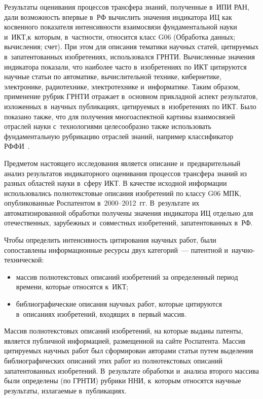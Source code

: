\begin{multicols}{2}
  Результаты оценивания процессов трансфера знаний, полученные в~ИПИ РАН, 
дали возмож\-ность впервые в~РФ вычислить значения индикатора ИЦ как 
косвенного показателя интенсив\-ности взаимосвязи фундаментальной науки 
и~ИКТ,\linebreak \mbox{к~которым}, в~частности, 
относится класс G06 (Обработка данных; вычисления; счет). При этом для 
описания тематики научных статей, цитируемых в~запатентованных 
изобретениях, использовался ГРНТИ. Вычисленные значения индикатора показали, что наиболее 
часто в~изобретениях по ИКТ цитируются научные статьи по автоматике, 
вычислительной технике, кибернетике, электронике, радиотехнике, 
электротехнике и~информатике. Таким образом, применение рубрик ГРНТИ 
отражает в~основном прикладной аспект результатов, изложенных в~научных 
пуб\-ли\-ка\-ци\-ях, цитируемых в~изобретениях по ИКТ. Было показано также, что для 
получения многоаспектной картины взаимосвязей отраслей науки с~технологиями 
целесообразно также использовать фундаментальную рубрикацию отраслей 
знаний, например классификатор РФФИ~\cite{19-min}.
  
  Предметом настоящего исследования является описание и~предварительный 
анализ результатов индикаторного оценивания процессов трансфера знаний из 
разных областей науки в~сферу ИКТ. В качестве исходной информации 
использовались полнотекстовые описания изобретений по классу G06 МПК, 
опуб\-ли\-ко\-ван\-ные Роспатентом в~2000--2012~гг. В~результате их 
автоматизированной обработки получены значения индикатора ИЦ отдельно для 
отечественных, зарубежных и~совместных изо\-бре\-тений, запатентованных в~РФ.



  
  Чтобы определить интенсивность цитирования научных работ, были 
сопоставлены информационные ресурсы двух категорий~--- патентной  
и~на\-уч\-но-тех\-ни\-че\-ской:
  \begin{itemize}
\item массив полнотекстовых описаний изобретений за определенный 
период времени, которые относятся к~ИКТ;
\item библиографические описания научных работ, которые цитируются 
в~описаниях изобретений, входящих в~первый массив.
\end{itemize}

  Массив полнотекстовых описаний изобретений, на которые выданы патенты, 
является пуб\-лич\-ной информацией, размещенной на сайте Роспатента. Массив 
цитируемых научных работ был сформирован авторами статьи путем выделения 
библиографических описаний этих работ из полнотекстовых описаний 
запатентованных изобретений. В~результате обработки и~анализа второго 
массива были определены (по ГРНТИ) рубрики ННИ, к~которым относятся научные результаты, 
излагаемые в~пуб\-ли\-ка\-циях.
  

\end{multicols}
